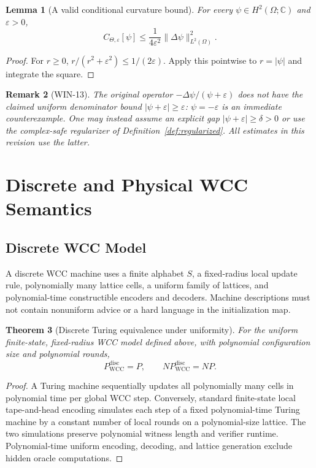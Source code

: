 \documentclass[11pt,a4paper]{article}
\newtheorem{theorem}{Theorem}[section]
\newtheorem{lemma}[theorem]{Lemma}
\newtheorem{remark}[theorem]{Remark}
\newcommand{\CTheta}{C_{\Theta,\varepsilon}}
\begin{document}
\begin{lemma}[A valid conditional curvature bound]
\label{lem:h2bound}
For every $\psi\in H^2(\Omega;\mathbb C)$ and $\varepsilon>0$,
\[
\CTheta[\psi]\le\frac{1}{4\varepsilon^2}
\|\Delta\psi\|_{L^2(\Omega)}^2.
\]
\end{lemma}
\begin{proof}
For $r\ge0$, $r/(r^2+\varepsilon^2)\le1/(2\varepsilon)$.
Apply this pointwise to $r=|\psi|$ and integrate the square.
\end{proof}

\begin{remark}[WIN-13]
The original operator $-\Delta\psi/(\psi+\varepsilon)$ does not have the
claimed uniform denominator bound $|\psi+\varepsilon|\ge\varepsilon$:
$\psi=-\varepsilon$ is an immediate counterexample. One may instead
assume an explicit gap $|\psi+\varepsilon|\ge\delta>0$ or use the
complex-safe regularizer of Definition~\ref{def:regularized}. All estimates
in this revision use the latter.
\end{remark}

\section{Discrete and Physical WCC Semantics}
\label{sec:two_semantics}
\subsection{Discrete WCC Model}
A discrete WCC machine uses a finite alphabet $S$, a fixed-radius local
update rule, polynomially many lattice cells, a uniform family of lattices,
and polynomial-time constructible encoders and decoders. Machine
descriptions must not contain nonuniform advice or a hard language in the
initialization map.

\begin{theorem}[Discrete Turing equivalence under uniformity]
\label{thm:disc-equiv}
For the uniform finite-state, fixed-radius WCC model defined above, with
polynomial configuration size and polynomial rounds,
\[
P^{\mathrm{disc}}_{\mathrm{WCC}}=P,
\qquad NP^{\mathrm{disc}}_{\mathrm{WCC}}=NP.
\]
\end{theorem}
\begin{proof}
A Turing machine sequentially updates all polynomially many cells in
polynomial time per global WCC step. Conversely, standard finite-state
local tape-and-head encoding simulates each step of a fixed polynomial-time
Turing machine by a constant number of local rounds on a polynomial-size
lattice. The two simulations preserve polynomial witness length and verifier
runtime. Polynomial-time uniform encoding, decoding, and lattice generation
exclude hidden oracle computations.
\end{proof}
\end{document}

